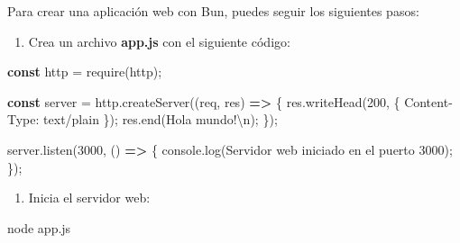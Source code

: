 \documentclass[
  a4paper,
  DIV=11,
  numbers=noendperiod,
  onepage,
  openany]{scrreprt}
\newenvironment{Shaded}{\begin{snugshade}}{\end{snugshade}}
\newcommand{\BuiltInTok}[1]{\textcolor[rgb]{0.00,0.23,0.31}{#1}}
\newcommand{\DecValTok}[1]{\textcolor[rgb]{0.68,0.00,0.00}{#1}}
\newcommand{\ExtensionTok}[1]{\textcolor[rgb]{0.00,0.23,0.31}{#1}}
\newcommand{\FunctionTok}[1]{\textcolor[rgb]{0.28,0.35,0.67}{#1}}
\newcommand{\KeywordTok}[1]{\textcolor[rgb]{0.00,0.23,0.31}{\textbf{#1}}}
\newcommand{\NormalTok}[1]{\textcolor[rgb]{0.00,0.23,0.31}{#1}}
\newcommand{\OperatorTok}[1]{\textcolor[rgb]{0.37,0.37,0.37}{#1}}
\newcommand{\PreprocessorTok}[1]{\textcolor[rgb]{0.68,0.00,0.00}{#1}}
\newcommand{\SpecialCharTok}[1]{\textcolor[rgb]{0.37,0.37,0.37}{#1}}
\newcommand{\StringTok}[1]{\textcolor[rgb]{0.13,0.47,0.30}{#1}}
\providecommand{\tightlist}{%
  \setlength{\itemsep}{0pt}\setlength{\parskip}{0pt}}\usepackage{longtable,booktabs,array}
\begin{document}
\begin{tcolorbox}
Para crear una aplicación web con Bun, puedes seguir los siguientes
pasos:

\begin{enumerate}
\def\labelenumi{\arabic{enumi}.}
\tightlist
\item
  Crea un archivo \textbf{app.js} con el siguiente código:
\end{enumerate}

\begin{Shaded}
\begin{Highlighting}[]
\KeywordTok{const}\NormalTok{ http }\OperatorTok{=} \PreprocessorTok{require}\NormalTok{(}\StringTok{\textquotesingle{}http\textquotesingle{}}\NormalTok{)}\OperatorTok{;}

\KeywordTok{const}\NormalTok{ server }\OperatorTok{=}\NormalTok{ http}\OperatorTok{.}\FunctionTok{createServer}\NormalTok{((req}\OperatorTok{,}\NormalTok{ res) }\KeywordTok{=\textgreater{}}\NormalTok{ \{}
\NormalTok{  res}\OperatorTok{.}\FunctionTok{writeHead}\NormalTok{(}\DecValTok{200}\OperatorTok{,}\NormalTok{ \{ }\StringTok{\textquotesingle{}Content{-}Type\textquotesingle{}}\OperatorTok{:} \StringTok{\textquotesingle{}text/plain\textquotesingle{}}\NormalTok{ \})}\OperatorTok{;}
\NormalTok{  res}\OperatorTok{.}\FunctionTok{end}\NormalTok{(}\StringTok{\textquotesingle{}Hola mundo!}\SpecialCharTok{\textbackslash{}n}\StringTok{\textquotesingle{}}\NormalTok{)}\OperatorTok{;}
\NormalTok{\})}\OperatorTok{;}

\NormalTok{server}\OperatorTok{.}\FunctionTok{listen}\NormalTok{(}\DecValTok{3000}\OperatorTok{,}\NormalTok{ () }\KeywordTok{=\textgreater{}}\NormalTok{ \{}
  \BuiltInTok{console}\OperatorTok{.}\FunctionTok{log}\NormalTok{(}\StringTok{\textquotesingle{}Servidor web iniciado en el puerto 3000\textquotesingle{}}\NormalTok{)}\OperatorTok{;}
\NormalTok{\})}\OperatorTok{;}
\end{Highlighting}
\end{Shaded}

\begin{enumerate}
\def\labelenumi{\arabic{enumi}.}
\setcounter{enumi}{1}
\tightlist
\item
  Inicia el servidor web:
\end{enumerate}

\begin{Shaded}
\begin{Highlighting}[]
\ExtensionTok{node}\NormalTok{ app.js}
\end{Highlighting}
\end{Shaded}


\end{tcolorbox}
\end{document}

